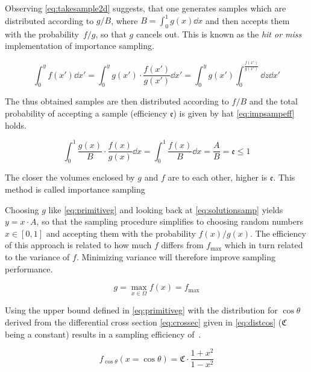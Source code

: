 Observing \cref{eq:takesample2d} suggests, that one generates samples
which are distributed according to \(g/B\), where
\(B=\int_0^1g(x)\dd{x}\) and then accepts them with the
probability~\(f/g\), so that \(g\) cancels out. This is known as the
\emph{hit or miss} implementation of importance sampling.

\begin{equation}
  \label{eq:takesample2d}
  \int_{0}^{y}f(x')\dd{x'} =
  \int_{0}^{y}g(x')\cdot\frac{f(x')}{g(x')}\dd{x'}
  = \int_{0}^{y}g(x')\int_{0}^{\frac{f(x')}{g(x')}}\dd{z}\dd{x'}
\end{equation}

The thus obtained samples are then distributed according to \(f/B\)
and the total probability of accepting a sample (efficiency
\(\mathfrak{e}\)) is given by hat \cref{eq:impsampeff} holds.

\begin{equation}
  \label{eq:impsampeff}
  \int_0^1\frac{g(x)}{B}\cdot\frac{f(x)}{g(x)}\dd{x} = \int_0^1\frac{f(x)}{B}\dd{x} = \frac{A}{B} = \mathfrak{e}\leq 1
\end{equation}

The closer the volumes enclosed by \(g\) and \(f\) are to each other,
higher is \(\mathfrak{e}\). This method is called importance sampling

Choosing \(g\) like \cref{eq:primitiveg} and looking back
at \cref{eq:solutionsamp} yields \(y = x\cdot A\), so that the
sampling procedure simplifies to choosing random numbers
\(x\in [0,1]\) and accepting them with the probability
\(f(x)/g(x)\). The efficiency of this approach is related to how much
\(f\) differs from \(f_{\text{max}}\) which in turn related to the
variance of \(f\). Minimizing variance will therefore improve sampling
performance.

\begin{equation}
  \label{eq:primitiveg}
  g=\max_{x\in\Omega}f(x)=f_{\text{max}}
\end{equation}

Using the upper bound defined in \cref{eq:primitiveg} with the
distribution for \(\cos\theta\) derived from the differential cross
section \cref{eq:crossec} given in \cref{eq:distcos}
(\(\mathfrak{C}\) being a constant) results in a sampling efficiency
of~.

\begin{equation}
  \label{eq:distcos}
  f_{\cos\theta}(x=\cos\theta) = \mathfrak{C}\cdot\frac{1+x^2}{1-x^2}
\end{equation}

